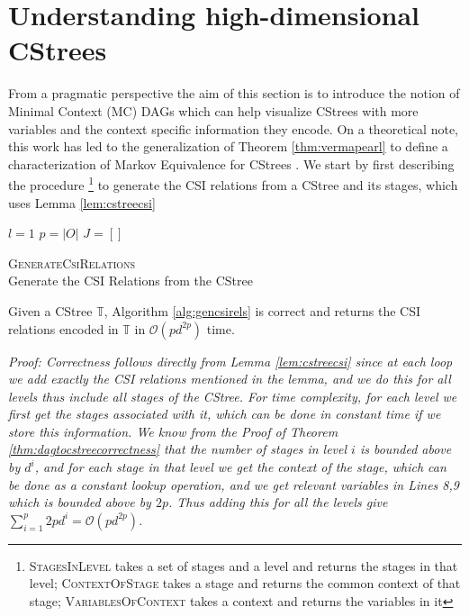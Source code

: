 \documentclass{tufte-book}
\begin{document}
\section{Understanding high-dimensional CStrees}
\label{sec:org1f6b922}
From a pragmatic perspective the aim of this section is to introduce the notion of Minimal Context (MC) DAGs which can help visualize CStrees with more variables and the context specific information they encode. On a theoretical note, this work has led to
  the generalization of Theorem \ref{thm:vermapearl} to define a characterization of Markov Equivalence for CStrees \cite{duarte-2021-repres-contex}. We start by first describing the procedure  \footnote{\textsc{StagesInLevel} takes a set of stages and a level and returns the stages in that level; \textsc{ContextOfStage} takes a stage and returns the common context of that stage; \textsc{VariablesOfContext} takes a context and returns the variables in it}  to generate the CSI relations from a CStree and its stages, which uses Lemma \ref{lem:cstreecsi}

   \begin{algorithm}\label{alg:gencsirels}
  \SetAlgoLined
  $l=1$\;
  $p=|O|$\;
  $J = []$\;
  
\caption{\textsc{GenerateCsiRelations} \\ Generate the CSI Relations from the CStree}

   \end{algorithm}


\begin{theorem}\label{thm:gencsirelscorrectness}
Given a CStree $\mathbb{T}$, Algorithm \ref{alg:gencsirels} is correct and returns the CSI relations encoded in $\mathbb{T}$ in $\mathcal{O}(pd^{2p})$ time.
\end{theorem}
\textit{Proof: Correctness follows directly from Lemma \ref{lem:cstreecsi} since at each loop we add exactly the CSI relations mentioned in the lemma, and we do this for all levels thus include all stages of the CStree. For time complexity, for each level we first get the stages associated with it, which can be done in constant time if we store this information. We know from the Proof of Theorem \ref{thm:dagtocstreecorrectness} that the number of stages in level $i$ is bounded above by $d^i$, and for each stage in that level we get the context of the stage, which can be done as a constant lookup operation, and we get relevant variables in Lines 8,9 which is bounded above by $2p$. Thus adding this for all the levels give $\sum_{i=1}^p 2pd^i = \mathcal{O}(pd^{2p})$.
}
\end{document}
